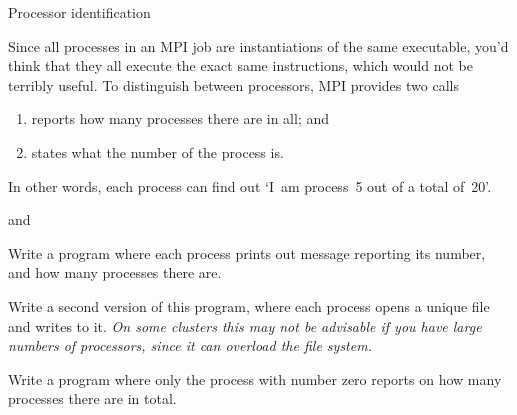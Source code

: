 
 {Processor identification}
\label{sec:rank-size}

Since all processes in an MPI job are instantiations of the same executable,
you'd think that they all execute the exact same instructions,
which would not be terribly useful.
To distinguish between processors, MPI provides two calls
\begin{enumerate}
\item {} reports how many processes there are in all; and
\item {} states what the number of the process is.
\end{enumerate}
In other words, each process can find out `I~am process~5
out of a total of~20'.

%
and
%

\begin{exercise}
  \label{ex:hello3}
  Write a program where each process prints out message
  reporting its number, and how many processes there are.

  Write a second version of this program, where each process opens a
  unique file and writes to it. \emph{On some clusters this may not be
    advisable if you have large numbers of processors, since it can
    overload the file system.}
\end{exercise}

\begin{exercise}
  \label{ex:hello4}
  Write a program where only the process with number zero
  reports on how many processes there are in total.
\end{exercise}

\endinput
This is probably about the simplest MPI program:
\verbatimsnippet{hello}
%
\verbatimsnippet{hellop}

